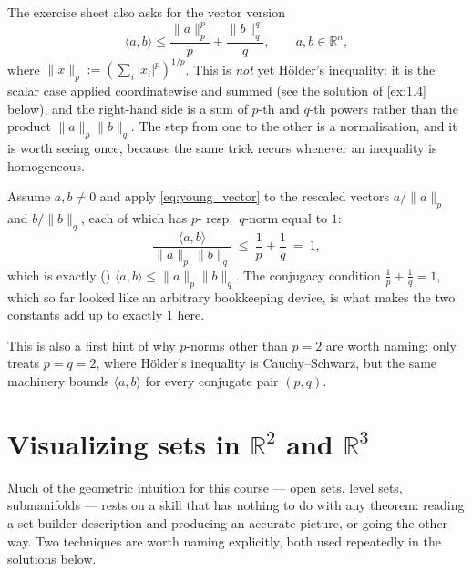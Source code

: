 \begin{remark}
\label{rem:young_to_hoelder}
The exercise sheet also asks for the vector version
\begin{equation}
\label{eq:young_vector}
  \langle a,b\rangle \leq \frac{\|a\|_p^p}{p} + \frac{\|b\|_q^q}{q}, \qquad a,b \in \mathbb{R}^n,
\end{equation}
where $\|x\|_p := \left(\sum_i |x_i|^p\right)^{1/p}$. This is \emph{not} yet Hölder's inequality:
it is the scalar case applied coordinatewise and summed (see the solution of \cref{ex:1.4}
below), and the right-hand side is a sum of $p$-th and $q$-th powers rather than the product
$\|a\|_p\|b\|_q$. The step from one to the other is a normalisation, and it is worth seeing
once, because the same trick recurs whenever an inequality is homogeneous.

Assume $a,b \neq 0$ and apply \eqref{eq:young_vector} to the rescaled vectors
$a/\|a\|_p$ and $b/\|b\|_q$, each of which has $p$- resp.\ $q$-norm equal to $1$:
\[
  \frac{\langle a,b\rangle}{\|a\|_p\,\|b\|_q} \ \leq\ \frac{1}{p} + \frac{1}{q} \ =\ 1,
\]
which is exactly  ()
$\langle a,b\rangle \leq \|a\|_p\|b\|_q$. The conjugacy condition
$\tfrac1p+\tfrac1q=1$, which so far looked like an arbitrary bookkeeping device, is what makes
the two constants add up to exactly $1$ here.

This is also a first hint of why $p$-norms other than $p=2$ are worth naming:
 only treats $p = q = 2$, where Hölder's inequality is
Cauchy--Schwarz, but the same machinery bounds $\langle a, b\rangle$ for every conjugate pair
$(p,q)$.
\end{remark}

\section{Visualizing sets in \texorpdfstring{$\mathbb{R}^2$}{R2} and \texorpdfstring{$\mathbb{R}^3$}{R3}}
\label{sec:visualizing_sets}

Much of the geometric intuition for this course --- open sets, level sets, submanifolds --- rests
on a skill that has nothing to do with any theorem: reading a set-builder description and
producing an accurate picture, or going the other way. Two techniques are worth naming
explicitly, both used repeatedly in the solutions below.

